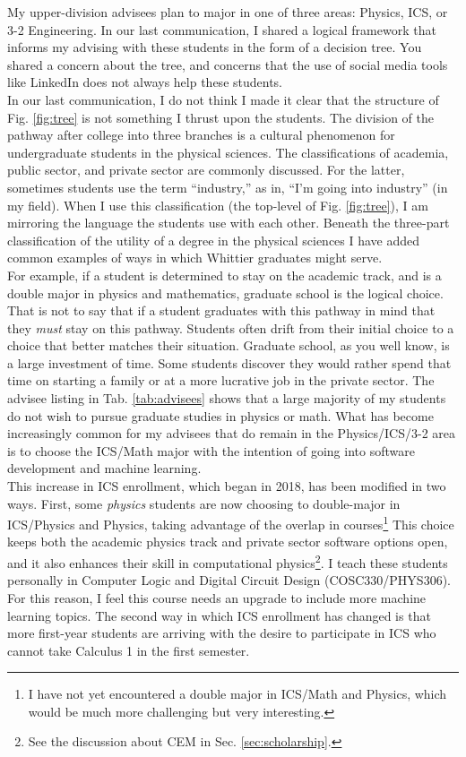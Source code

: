 \documentclass[../../main.tex]{subfiles}
\begin{document}
My upper-division advisees plan to major in one of three areas: Physics, ICS, or 3-2 Engineering.  In our last communication, I shared a logical framework that informs my advising with these students in the form of a decision tree.  You shared a concern about the tree, and concerns that the use of social media tools like LinkedIn does not always help these students.
\\
\vspace{0.25cm}
In our last communication, I do not think I made it clear that the structure of Fig. \ref{fig:tree} is not something I thrust upon the students.  The division of the pathway after college into three branches is a cultural phenomenon for undergraduate students in the physical sciences.  The classifications of academia, public sector, and private sector are commonly discussed.  For the latter, sometimes students use the term ``industry,'' as in, ``I'm going into industry'' (in my field).  When I use this classification (the top-level of Fig. \ref{fig:tree}), I am mirroring the language the students use with each other.  Beneath the three-part classification of the utility of a degree in the physical sciences I have added common examples of ways in which Whittier graduates might serve.
\\
\vspace{0.25cm}
For example, if a student is determined to stay on the academic track, and is a double major in physics and mathematics, graduate school is the logical choice.  That is not to say that if a student graduates with this pathway in mind that they \textit{must} stay on this pathway.  Students often drift from their initial choice to a choice that better matches their situation.  Graduate school, as you well know, is a large investment of time.  Some students discover they would rather spend that time on starting a family or at a more lucrative job in the private sector.  The advisee listing in Tab. \ref{tab:advisees} shows that a large majority of my students do not wish to pursue graduate studies in physics or math.  What has become increasingly common for my advisees that do remain in the Physics/ICS/3-2 area is to choose the ICS/Math major with the intention of going into software development and machine learning.
\\
\vspace{0.25cm}
This increase in ICS enrollment, which began in 2018, has been modified in two ways.  First, some \textit{physics} students are now choosing to double-major in ICS/Physics and Physics, taking advantage of the overlap in courses\footnote{I have not yet encountered a double major in ICS/Math and Physics, which would be much more challenging but very interesting.}  This choice keeps both the academic physics track and private sector software options open, and it also enhances their skill in computational physics\footnote{See the discussion about CEM in Sec. \ref{sec:scholarship}.}.  I teach these students personally in Computer Logic and Digital Circuit Design (COSC330/PHYS306).  For this reason, I feel this course needs an upgrade to include more machine learning topics.  The second way in which ICS enrollment has changed is that more first-year students are arriving with the desire to participate in ICS who cannot take Calculus 1 in the first semester.
\end{document}
